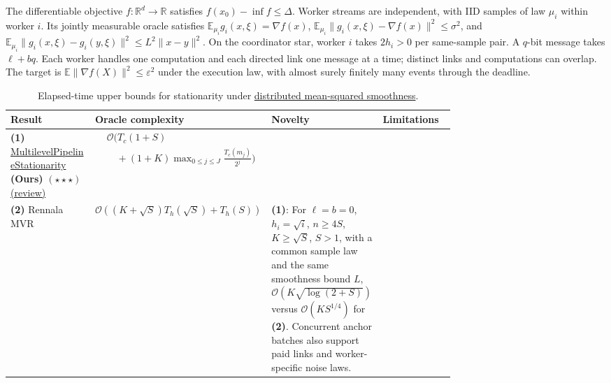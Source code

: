\begin{table}[tp]
\centering
\caption{Elapsed-time upper bounds for stationarity under \href{https://github.com/k3nfalt/longtails/blob/main/LongTails/Setups/DistributedMeanSquaredSmooth.lean}{distributed mean-squared smoothness}.}\label{tab:DistributedMeanSquaredSmooth}
\parbox{\linewidth}{\footnotesize The differentiable objective $f:\mathbb R^d\to\mathbb R$ satisfies $f(x_0)-\inf f\le\Delta$. Worker streams are independent, with IID samples of law $\mu_i$ within worker $i$. Its jointly measurable oracle satisfies $\mathbb E_{\mu_i}g_i(x,\xi)=\nabla f(x)$, $\mathbb E_{\mu_i}\|g_i(x,\xi)-\nabla f(x)\|^2\le\sigma^2$, and $\mathbb E_{\mu_i}\|g_i(x,\xi)-g_i(y,\xi)\|^2\le L^2\|x-y\|^2$. On the coordinator star, worker $i$ takes $2h_i>0$ per same-sample pair. A $q$-bit message takes $\ell+bq$. Each worker handles one computation and each directed link one message at a time; distinct links and computations can overlap. The target is $\mathbb E\|\nabla f(X)\|^2\le\varepsilon^2$ under the execution law, with almost surely finitely many events through the deadline.}\par\smallskip
\begin{threeparttable}
\footnotesize
\setlength{\tabcolsep}{4pt}\renewcommand{\arraystretch}{1.25}
\begin{tabularx}{\linewidth}{@{}>{\raggedright\arraybackslash}p{0.19\linewidth}>{\raggedright\arraybackslash}p{0.30\linewidth}>{\raggedright\arraybackslash}p{0.25\linewidth}>{\raggedright\arraybackslash}X@{}}
\toprule
\textbf{Result} & \textbf{Oracle complexity} & \textbf{Novelty} & \textbf{Limitations} \\
\midrule
\textbf{(1)} \href{https://github.com/k3nfalt/longtails/blob/main/LongTails/Theorems/MultilevelPipelineStationarity.lean}{Multilevel\allowbreak Pipeline\allowbreak Stationarity} \textbf{(Ours)} $(\star\star\star)$ \href{https://github.com/k3nfalt/longtails/blob/main/scripts/reviews/MultilevelPipelineStationarity.md}{(review)}
& $\begin{aligned}&\mathcal{O}\!\bigg(T_c(1+S)\\[-2pt]&\quad +(1+K)\max_{0\le j\le J}\frac{T_c(m_j)}{2^j}\bigg)\end{aligned}$ & & \\
\midrule[1.2pt]
\textbf{(2)} Rennala MVR \citep[Thm.~5.2]{dmssRennalaMVRv1}
& $\mathcal{O}\!\left((K+\sqrt S)T_h(\sqrt S)+T_h(S)\right)$
& \textbf{(1)}: For $\ell=b=0$, $h_i=\sqrt i$, $n\ge4S$, $K\ge\sqrt S$, $S>1$, with a common sample law and the same smoothness bound $L$, $\mathcal{O}(K\sqrt{\log(2+S)})$ versus $\mathcal{O}(KS^{1/4})$ for \textbf{(2)}. Concurrent anchor batches also support paid links and worker-specific noise laws.

\end{tabularx}
\end{threeparttable}
\end{table}
